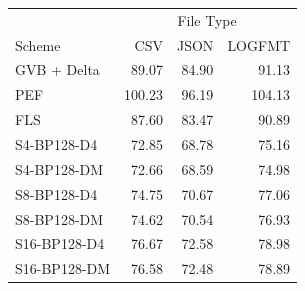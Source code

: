 \begin{tabular}{lrrr}
\toprule
 & \multicolumn{3}{c}{File Type} \\
Scheme & CSV & JSON & LOGFMT \\
\midrule
GVB + Delta & 89.07 & 84.90 & 91.13 \\
PEF & 100.23 & 96.19 & 104.13 \\
FLS & 87.60 & 83.47 & 90.89 \\
S4-BP128-D4 & 72.85 & 68.78 & 75.16 \\
S4-BP128-DM & 72.66 & 68.59 & 74.98 \\
S8-BP128-D4 & 74.75 & 70.67 & 77.06 \\
S8-BP128-DM & 74.62 & 70.54 & 76.93 \\
S16-BP128-D4 & 76.67 & 72.58 & 78.98 \\
S16-BP128-DM & 76.58 & 72.48 & 78.89 \\
\bottomrule
\end{tabular}
